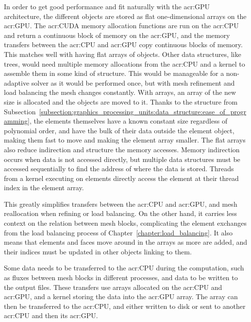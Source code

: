 In order to get good performance and fit naturally with the \acrshort{acr:GPU} architecture, the
different objects are stored as flat one-dimensional arrays on the \acrshort{acr:GPU}. The
\acrshort{acr:CUDA} memory allocation functions are run on the \acrshort{acr:CPU} and return a
continuous block of memory on the \acrshort{acr:GPU}, and the memory transfers between the
\acrshort{acr:CPU} and \acrshort{acr:GPU} copy continuous blocks of memory. This matches well with
having flat arrays of objects. Other data structures, like trees, would need multiple memory
allocations from the \acrshort{acr:CPU} and a kernel to assemble them in some kind of structure.
This would be manageable for a non-adaptive solver as it would be performed once, but with mesh
refinement and load balancing the mesh changes constantly. With arrays, an array of the new size is
allocated and the objects are moved to it. Thanks to the structure from
Subsection~\ref{subsection:graphics_processing_units:data_structure:ease_of_programming}, the
elements themselves have a known constant size regardless of polynomial order, and have the bulk of
their data outside the element object, making them fast to move and making the element array
smaller. The flat arrays also reduce indirection and structure the memory accesses. Memory
indirection occurs when data is not accessed directly, but multiple data structures must be accessed
sequentially to find the address of where the data is stored. Threads from a kernel executing on
elements directly access the element at their thread index in the element array.

This greatly simplifies transfers between the \acrshort{acr:CPU} and \acrshort{acr:GPU}, and mesh
reallocation when refining or load balancing. On the other hand, it carries less context on the
relation between mesh blocks, complicating the element exchanges from the load balancing process of
Chapter~\ref{chapter:load_balancing}. It also means that elements and faces move around in the
arrays as more are added, and their indices must be updated in other objects linking to them. 

Some data needs to be transferred to the \acrshort{acr:CPU} during the computation, such as fluxes
between mesh blocks in different processes, and data to be written to the output files. These
transfers use arrays allocated on the \acrshort{acr:CPU} and \acrshort{acr:GPU}, and a kernel
storing the data into the \acrshort{acr:GPU} array. The array can then be transferred to the
\acrshort{acr:CPU}, and either written to disk or sent to another \acrshort{acr:CPU} and then its
\acrshort{acr:GPU}.

